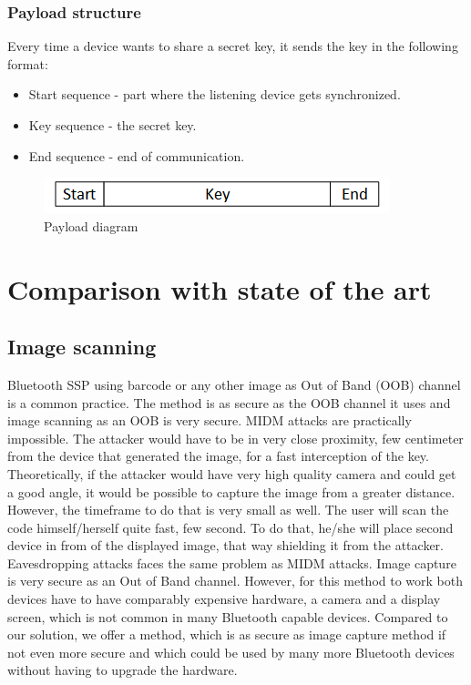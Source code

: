 \documentclass[12pt]{article}
\begin{document}
\subsubsection{Payload structure}
Every time a device wants to share a secret key, it sends the key in the following format:

\begin{itemize}
    \item Start sequence - part where the listening device gets synchronized.
    \item Key sequence - the secret key.
    \item End sequence - end of communication.
\end{itemize}

\begin{figure}[h!]
    \includegraphics[scale=1]{fig/payload.png}
    \caption{Payload diagram}
\end{figure}


\section{Comparison with state of the art}
\label{sec:Comparison with state of the art}

\subsection{Image scanning}
\label{sub:Image scanning}

Bluetooth SSP using barcode or any other image as Out of Band (OOB) channel is a common practice. The method is as secure as the OOB channel it uses and image scanning as an OOB is very secure. MIDM attacks are practically impossible. The attacker would have to be in very close proximity, few centimeter from the device that generated the image, for a fast interception of the key. Theoretically, if the attacker would have very high quality camera and could get a good angle, it would be possible to capture the image from a greater distance. However, the timeframe to do that is very small as well. The user will scan the code himself/herself quite fast, few second. To do that, he/she will place second device in from of the displayed image, that way shielding it from the attacker. Eavesdropping attacks faces the same problem as MIDM attacks.
Image capture is very secure as an Out of Band channel. However, for this method to work both devices have to have comparably expensive hardware, a camera and a display screen, which is not common in many Bluetooth capable devices. Compared to our solution, we offer a method, which is as secure as image capture method if not even more secure and which could be used by many more Bluetooth devices without having to upgrade the hardware.
\end{document}

